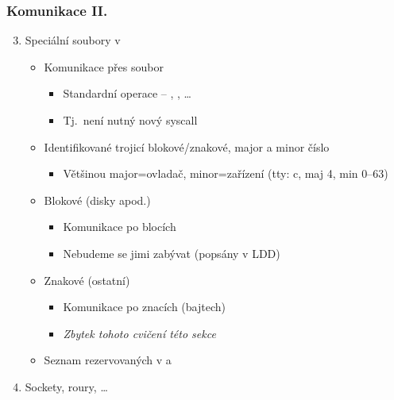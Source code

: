 \begin{frame}
  \frametitle{Komunikace II.}

  \begin{enumerate}
    \setcounter{enumi}{2}

    \item Speciální soubory v 
    \begin{itemize}
      \item Komunikace přes soubor
      \begin{itemize}
	\item Standardní operace -- , , \dots
	\item Tj.\ není nutný nový syscall
      \end{itemize}

      \pause

      \item Identifikované trojicí blokové/znakové, major a minor číslo
      \begin{itemize}
	\item Většinou major=ovladač, minor=zařízení (tty: c, maj 4, min 0--63)
      \end{itemize}

      \pause

      \item Blokové (disky apod.)
      \begin{itemize}
	\item Komunikace po blocích
	\item Nebudeme se jimi zabývat (popsány v LDD)
      \end{itemize}

      \pause

      \item Znakové (ostatní)
      \begin{itemize}
	\item Komunikace po znacích (bajtech)
	\item \emph{Zbytek \iffimuni tohoto cvičení \else této sekce \fi}
      \end{itemize}

      \pause

      \item Seznam rezervovaných v  a
    \end{itemize}

    \pause

    \item Sockety, roury, \dots
  \end{enumerate}

\end{frame}

